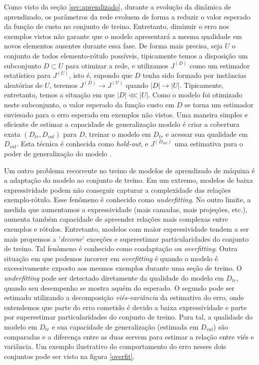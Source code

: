 Como visto da seção \ref{sec:aprendizado}, durante a evolução da dinâmica de aprendizado, os parâmetros da rede evoluem de forma a reduzir o valor esperado da função de custo no conjunto de treino. Entretanto, diminuir o erro nos exemplos vistos não garante que o modelo apresentará a mesma qualidade em novos elementos ausentes durante essa fase. De forma mais precisa, seja $U$ o conjunto de todos elemento-rótulo possíveis, tipicamente temos a disposição um subconjunto $D \subset U$ para otimizar a rede, e utilizamos $J^{(D)}$ como um estimador estatístico para $J^{(U)}$, isto é, supondo que $D$ tenha sido formado por instâncias aleatórias de $U$, teremos $J^{(D)} \rightarrow J^{(U)}$ quando $|D| \rightarrow |U|$. Tipicamente, entretanto, temos a situação em que $|D| \lll |U|$. Como o modelo foi otimizado neste subconjunto, o valor esperado da função custo em $D$ se torna um estimador enviesado para o erro esperado em exemplos não vistos. Uma maneira simples e eficiente de estimar a capacidade de generalização modelo é criar a cobertura exata $(D_{tr}, D_{val})$ para $D$, treinar o modelo em $D_{tr}$ e acessar sua qualidade em $D_{val}$. Esta técnica é conhecida como \textit{hold-out}, e $J^{(D_{val})}$ uma estimativa para o poder de generalização do modelo \cite{friedman2001elements}.

Um outro problema recorrente no treino de modelos de aprendizado de máquina é a adaptação do modelo ao conjunto de treino. Em um extremo, modelos de baixa expressividade podem não conseguir capturar a complexidade das relações exemplo-rótulo. Esse fenômeno é conhecido como \textit{underfitting}. No outro limite, a medida que aumentamos a expressividade (mais camadas, mais projeções, etc.), aumenta também capacidade de apreender relações mais complexas entre exemplos e rótulos. Entretanto, modelos com maior expressividade tendem a ser mais propensos a '\textit{decorar}' exceções e superestimar particularidades do conjunto de treino. Tal fenômeno é conhecido como coadaptação ou \textit{overfitting}. Outra situação em que podemos incorrer em \textit{overfitting} é quando o modelo é excessivamente exposto aos mesmos exemplos durante uma seção de treino. O \textit{underfitting} pode ser detectado diretamente da qualidade do modelo em $D_{tr}$, quando seu desempenho se mostra aquém do esperado. O segundo pode ser estimado utilizando a decomposição \textit{viés-variância} da estimativa do erro, onde entendemos que parte do erro cometido é devido a baixa expressividade e parte por superestimar particularidades do conjunto de treino. Para tal, a qualidade do modelo em $D_{tr}$ e sua capacidade de generalização (estimada em $D_{val}$) são comparadas e a diferença entre as duas servem para estimar a relação entre viés e variância. Um exemplo ilustrativo do comportamento do erro nesses dois conjuntos pode ser visto na figura \ref{overfit}.

